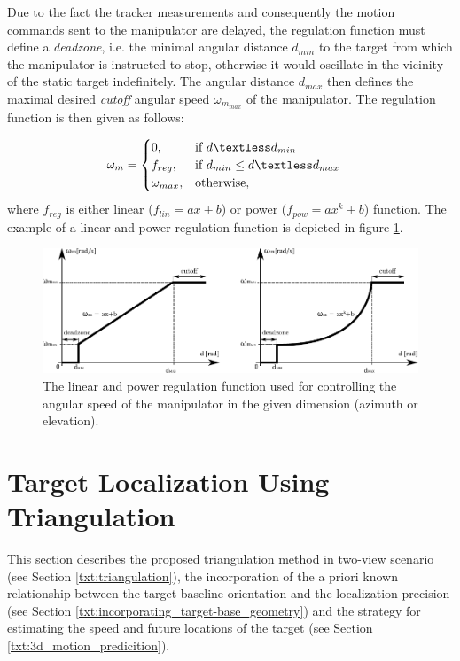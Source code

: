 Due to the fact the tracker measurements and consequently the motion commands sent to the manipulator are delayed, the regulation function must define a \textit{deadzone}, i.e. the minimal angular distance $d_{min}$ to the target from which the manipulator is instructed to stop, otherwise it would oscillate in the vicinity of the static target indefinitely. The angular distance $d_{max}$ then defines the maximal desired \textit{cutoff} angular speed $\omega_{m_{max}}$ of the manipulator. The regulation function is then given as follows:

\begin{align}
	\omega_{m} &=
	\begin{cases}
		0,  & \text{if}\ d \textless d_{min}\\
		f_{reg},  & \text{if}\ d_{min} \leq d \textless d_{max}\\
		\omega_{max}, & \text{otherwise},
	\end{cases}
\end{align}
where $f_{reg}$ is either linear ($f_{lin} = ax+b$) or power ($f_{pow} = ax^{k}+b$) function. The example of a linear and power regulation function is depicted in figure \ref{fig:regulation_lin_power}.

\begin{figure}[htb]
	\centering
	\includegraphics[width=0.75\linewidth]{fig/regulation_linear_power.pdf}
	\caption{The linear and power regulation function used for controlling the angular speed of the manipulator in the given dimension (azimuth or elevation).}
	\label{fig:regulation_lin_power}
\end{figure}

\section{Target Localization Using Triangulation} \label{txt:target_localization_using_triangulation}

This section describes the proposed triangulation method in two-view scenario (see Section \ref{txt:triangulation}), the incorporation of the a priori known relationship between the target-baseline orientation and the localization precision (see Section \ref{txt:incorporating_target-base_geometry}) and the strategy for estimating the speed and future locations of the target (see Section \ref{txt:3d_motion_predicition}).

